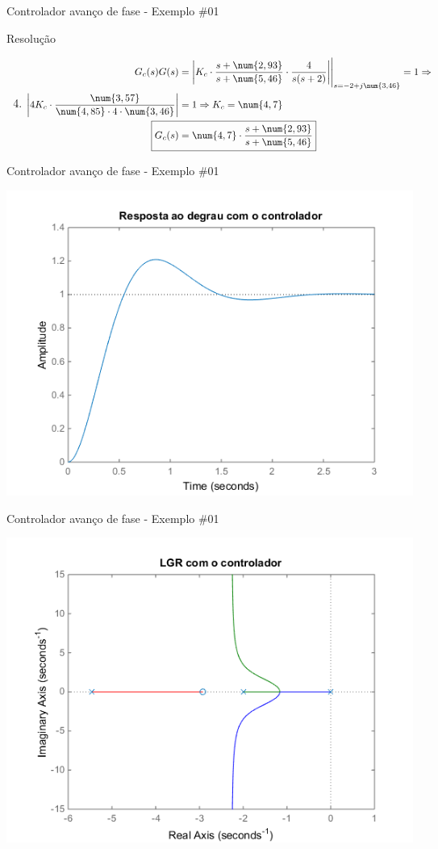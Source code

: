 \begin{frame}{Controlador avanço de fase - Exemplo \#01}
\begin{block}{Resolução}
\begin{enumerate}
	\setcounter{enumi}{3}
	\item \begin{align*}
		G_c(s)G(s)&=\eval{\left| K_c\cdot\dfrac{s+\num{2,93}}{s+\num{5,46}}\cdot\dfrac{4}{s(s+2)}\right|}_{s=-2+j\num{3,46}}=1\Rightarrow\\
		\left| 4K_c\cdot\dfrac{\num{3,57}}{\num{4,85}\cdot4\cdot\num{3,46}} \right|&=1\Rightarrow K_c=\num{4,7}\\
		\Aboxed{G_c(s)&=\num{4,7}\cdot\dfrac{s+\num{2,93}}{s+\num{5,46}}}
	\end{align*}
\end{enumerate}
\end{block}
\end{frame}

\begin{frame}{Controlador avanço de fase - Exemplo \#01}
\centerline{\includegraphics[width=0.8\linewidth]{Figuras/Ch09/fig3.png}}
\end{frame}

\begin{frame}{Controlador avanço de fase - Exemplo \#01}
\centerline{\includegraphics[width=0.8\linewidth]{Figuras/Ch09/fig4.png}}
\end{frame}

